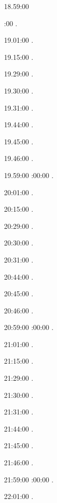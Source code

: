 18.59:00 

:00 .

19.01:00 . 

19.15:00 . 

19.29:00 . 

19.30:00 .

19.31:00 .

19.44:00 .

19.45:00 .

19.46:00 .

19.59:00 
:00:00 .

20:01:00 . 

20:15:00 . 

20:29:00 . 

20:30:00 .

20:31:00 .

20:44:00 .

20:45:00 .

20:46:00 .

20:59:00 
:00:00 .

21:01:00 . 

21:15:00 . 

21:29:00 . 

21:30:00 .

21:31:00 .

21:44:00 .

21:45:00 .

21:46:00 .

21:59:00 
:00:00 .

22:01:00 . 

